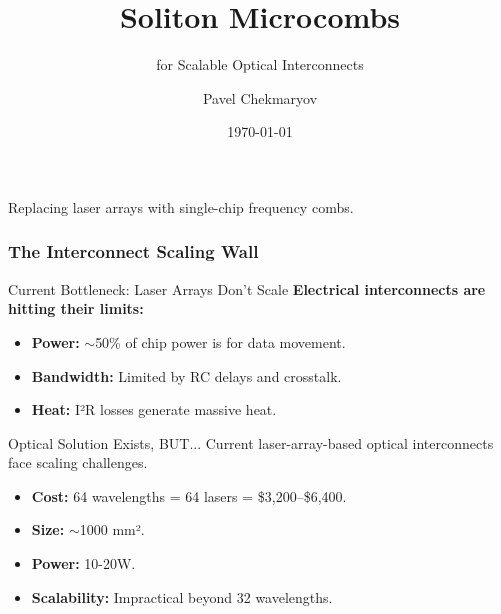 \documentclass{beamer}
\title[Soliton Microcombs]{Soliton Microcombs}
\subtitle{for Scalable Optical Interconnects}
\author{Pavel Chekmaryov}
\institute{\href{mailto:p@occurai.com}{p@occurai.com}}
\date{\today}
\begin{document}
\begin{frame}
    \titlepage
    \begin{center}
        \vspace{0.5cm}
        \small Replacing laser arrays with single-chip frequency combs.
    \end{center}
\end{frame}

\begin{frame}
    \frametitle{The Interconnect Scaling Wall}

    \begin{alertblock}{Current Bottleneck: Laser Arrays Don't Scale}
        \textbf{Electrical interconnects are hitting their limits:}
        \begin{itemize}
            \item \textbf{Power:} $\sim$50\% of chip power is for data movement.
            \item \textbf{Bandwidth:} Limited by RC delays and crosstalk.
            \item \textbf{Heat:} I²R losses generate massive heat.
        \end{itemize}
    \end{alertblock}

    \begin{block}{Optical Solution Exists, BUT...}
        Current laser-array-based optical interconnects face scaling challenges.
        \begin{itemize}
            \item \textbf{Cost:} 64 wavelengths = 64 lasers = \$3,200--\$6,400.
            \item \textbf{Size:} $\sim$1000 mm².
            \item \textbf{Power:} 10-20W.
            \item \textbf{Scalability:} Impractical beyond 32 wavelengths.
        \end{itemize}
    \end{block}
\end{frame}
\end{document}
